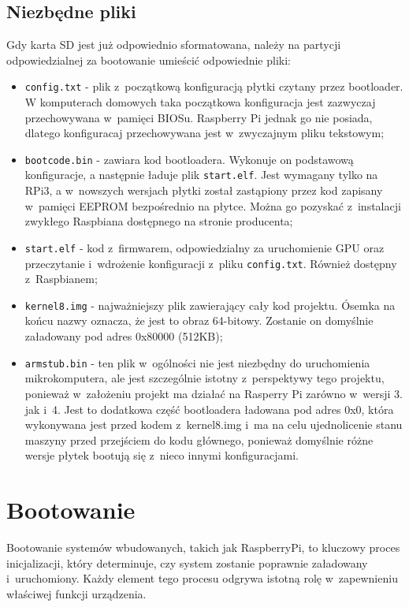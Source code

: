 \documentclass[shortabstract]{iithesis}
\begin{document}
\subsection{Niezbędne pliki}
Gdy karta SD jest już odpowiednio sformatowana, należy na partycji odpowiedzialnej za bootowanie umieścić odpowiednie pliki:
\begin{itemize}
 \item \texttt{config.txt}  - plik z~początkową konfiguracją płytki czytany przez bootloader. W komputerach domowych taka początkowa konfiguracja jest zazwyczaj przechowywana w~pamięci BIOSu. Raspberry Pi jednak go nie posiada, dlatego konfiguracaj przechowywana jest w~zwyczajnym pliku tekstowym;
 \item \texttt{bootcode.bin}  - zawiara kod bootloadera. Wykonuje on podstawową konfiguracje, a następnie ładuje plik \texttt{start.elf}. Jest wymagany tylko na RPi3, a w~nowszych wersjach płytki został zastąpiony przez kod zapisany w~pamięci EEPROM bezpośrednio na płytce. Można go pozyskać z~instalacji zwykłego Raspbiana dostępnego na stronie producenta;
 \item \texttt{start.elf}  - kod z~firmwarem, odpowiedzialny za uruchomienie GPU oraz przeczytanie i~wdrożenie konfiguracji z~pliku \texttt{config.txt}. Również dostępny z~Raspbianem;
 \item \texttt{kernel8.img}  - najważniejszy plik zawierający cały kod projektu. Ósemka na końcu nazwy oznacza, że jest to obraz 64-bitowy. Zostanie on domyślnie załadowany pod adres 0x80000 (512KB);
 \item \texttt{armstub.bin}  - ten plik w~ogólności nie jest niezbędny do uruchomienia mikrokomputera, ale jest szczególnie istotny z~perspektywy tego projektu, ponieważ w~założeniu projekt ma działać na Rasperry Pi zarówno w~wersji 3. jak i~4. Jest to dodatkowa część bootloadera ładowana pod adres 0x0, która wykonywana jest przed kodem z~kernel8.img i~ma na celu ujednolicenie stanu maszyny przed przejściem do kodu głównego, ponieważ domyślnie różne wersje płytek bootują się z~nieco innymi konfiguracjami.
\end{itemize}

\section{Bootowanie}
Bootowanie systemów wbudowanych, takich jak RaspberryPi, to kluczowy proces inicjalizacji, który determinuje, czy system zostanie poprawnie załadowany i~uruchomiony. Każdy element tego procesu odgrywa istotną rolę w~zapewnieniu właściwej funkcji urządzenia.
\end{document}
